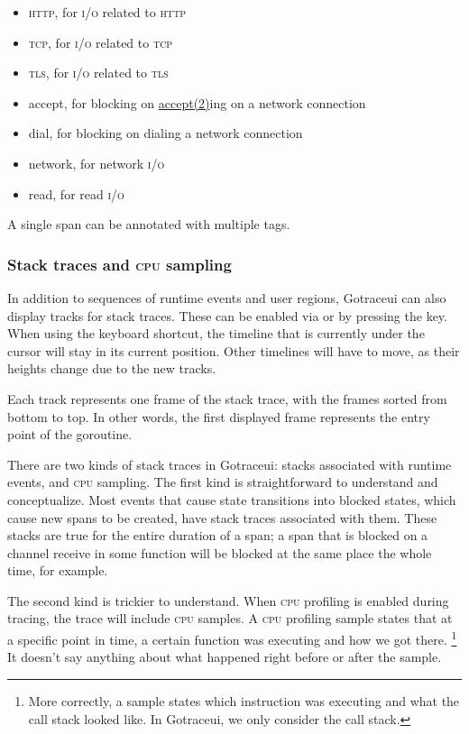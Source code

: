 \documentclass[10pt,letterpaper,oneside,openany,english]{memoir}
\newcommand{\code}[1]{{\ttfamily\mbox{#1}}}
\begin{document}
\begin{itemize}
\item \code{\textsc{http}}, for \textsc{i/o} related to \textsc{http}
\item \code{\textsc{tcp}}, for \textsc{i/o} related to \textsc{tcp}
\item \code{\textsc{tls}}, for \textsc{i/o} related to \textsc{tls}
\item \code{accept}, for blocking on \href{https://man7.org/linux/man-pages/man2/accept.2.html}{accept(2)}ing\cite{AcceptLinuxManual2021} on a network connection
\item \code{dial}, for blocking on dialing a network connection
\item \code{network}, for network \textsc{i/o}
\item \code{read}, for read \textsc{i/o}
\end{itemize}

A single span can be annotated with multiple tags.


\subsubsection{Stack traces and \textsc{cpu} sampling}\label{cpu-sampling}
In addition to sequences of runtime events and user regions, Gotraceui can also display tracks for stack traces.
These can be enabled via  or by pressing the  key.
When using the keyboard shortcut, the timeline that is currently under the cursor will stay in its current position.
Other timelines will have to move, as their heights change due to the new tracks.

Each track represents one frame of the stack trace, with the frames sorted from bottom to top.
In other words, the first displayed frame represents the entry point of the goroutine.

There are two kinds of stack traces in Gotraceui: stacks associated with runtime events, and \textsc{cpu} sampling.
The first kind is straightforward to understand and conceptualize.
Most events that cause state transitions into blocked states, which cause new spans to be created, have stack traces associated with them.
These stacks are true for the entire duration of a span;
a span that is blocked on a channel receive in some function will be blocked at the same place the whole time, for example.

The second kind is trickier to understand. When \textsc{cpu} profiling is enabled during tracing, the trace will include \textsc{cpu} samples.
A \textsc{cpu} profiling sample states that at a specific point in time, a certain function was executing and how we got there.%
\footnote{More correctly, a sample states which instruction was executing and what the call stack looked like.
  In Gotraceui, we only consider the call stack.}
It doesn't say anything about what happened right before or after the sample.
\end{document}
